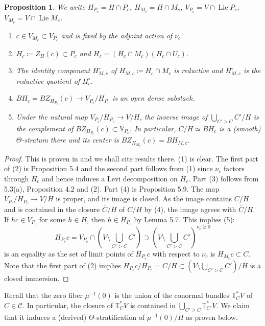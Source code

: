 \documentclass{amsart}
\newtheorem{proposition}[theorem]{Proposition}
\theoremstyle{definition}
\theoremstyle{remark}
\numberwithin{equation}{section}
\DeclareMathOperator{\Lie}{Lie}
\newcommand{\V}{\mathbb{V}}
\newcommand{\T}{\mathbb{T}}
\begin{document}
\begin{proposition}{\label{prop: nuthetastrat}}
We write $H_{P_c}=H\cap P_c$, $H_{M_c}=H\cap M_c$, $V_{P_c}=V\cap \Lie P_c$, $V_{M_c}=V\cap \Lie M_c$. 
\begin{enumerate}
    \item $c\in V_{M_c} \subset V_{P_c}$ and is fixed by the adjoint action of $\nu_c$. 
    \item $H_c \coloneq Z_{H}(c)\subset P_c$ and $H_c=(H_c \cap M_c)(H_c \cap U_c)$. 
    \item The identity component $H_{M,c}^{\circ}$ of $H_{M,c}\coloneq H_c \cap M_c$ is reductive and $H_{M,c}^{\circ}$ is the reductive quotient of $H^{\circ}_c$. 
    \item $BH_c=BZ_{H_{P_c}}(c)\to V_{P_c}/H_{P_c}$ is an open dense substack. 
    \item Under the natural map $V_{P_c}/H_{P_c}\to V/H$, the inverse image of $\bigcup_{C'> C}C'/H$ is the complement of $BZ_{H_{P_c}}(c)\subset \V_{P_c}$. In particular, $C/H\simeq BH_c$ is a (smooth) $\Theta$-stratum there and its center is $BZ_{H_{M_c}}(c)=BH_{M,c}$.
\end{enumerate}
\end{proposition}


\begin{proof}
This is proven in \cite{LusztigGraded} and we shall cite results there. 
(1) is clear. The first part of (2) is Proposition 5.4 and the second part follows from (1) since $\nu_c$ factors through $H_c$ and hence induces a Levi decomposition on $H_c$. Part (3) follows from 5.3(a), Proposition 4.2 and (2). Part (4) is Proposition 5.9. The map $V_{P_c}/H_{P_c}\to V/H$ is proper, and its image is closed. As the image contains $C/H$ and is contained in the closure $\overline{C}/H$ of $C/H$ by (4), the image agrees with $\overline{C}/H$. If $hc\in V_{P_c}$ for some $h\in H$, then $h\in H_{P_c}$ by Lemma 5.7. This implies (5):
\[
H_{P_c}c=
V_{P_c} \cap (V\setminus \bigcup_{C'> C}C')\supset
(V\setminus \bigcup_{C'> C}C')^{\nu_c \geq 0}
\]
is an equality as the set of limit points of $H_{P_c}c$ with respect to $\nu_c$ is $H_{M_c}c\subset C$. Note that the first part of (2) implies $H_{P_c}c/H_{P_c} = C/H \subset (V \setminus \bigcup\limits_{C' > C} C')/H$ is a closed immersion.
\end{proof}


Recall that the zero fiber $\mu^{-1}(0)$ is the union of the conormal bundles $\T_C^* V$ of $C\in \mathcal{C}$. In particular, the closure of $\T_C^* V$ is contained in $\bigcup_{C'\geq C} \T_{C'}^*V$. We claim that it induces a (derived) $\Theta$-stratification of $\mu^{-1}(0)/H$ as proven below.
\end{document}
